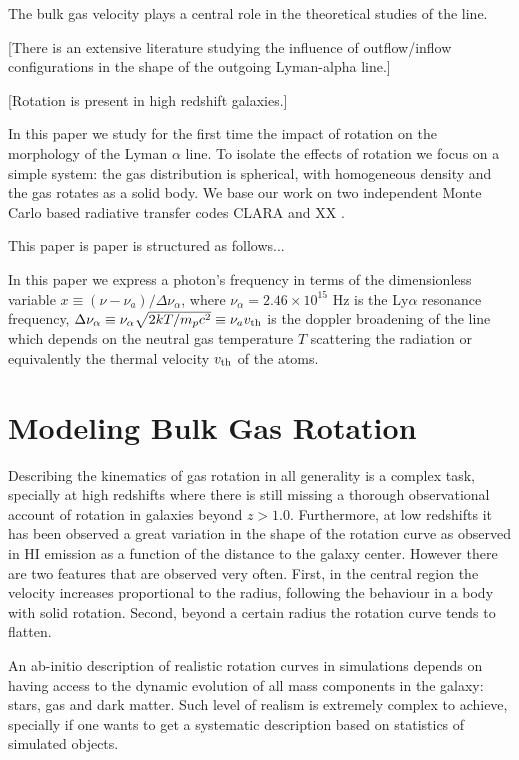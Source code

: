 \documentclass[usenatbib]{mn2e}
\newcommand{\ly}{{\ifmmode{{\rm Ly}\alpha~}\else{Ly$\alpha$~}\fi}}
\begin{document}
The bulk gas velocity
plays a central role in the theoretical studies of the \ly line. 


[There is an extensive literature studying the influence of
outflow/inflow configurations in the shape of the outgoing Lyman-alpha
line.]


[Rotation is present in high redshift galaxies.]

In this paper we study for the first time the impact of rotation on
the morphology of the Lyman $\alpha$ line. To isolate the effects of
rotation we focus on a simple system: the gas distribution is
spherical, with homogeneous density and the gas rotates as a solid
body. We base our work on two independent Monte Carlo based radiative
transfer codes CLARA \citep{CLARA} and XX \citep{DijkstraKramer}.

 
This paper is paper is structured as follows...

In this paper we express a photon's frequency in terms of the
dimensionless variable $x\equiv (\nu -\nu_a)/\Delta\nu_\alpha$, where
$\nu_{\alpha}=2.46\times 10^{15}$ Hz is the Ly$\alpha$ resonance
frequency,  $\Delta\nu_{\alpha} \equiv
\nu_{\alpha}\sqrt{2kT/m_pc^2}\equiv \nu_av_{\rm th} $ is the doppler
broadening of the line which depends on the neutral gas temperature
$T$ scattering the radiation or equivalently the thermal velocity
$v_{\rm th}$ of the atoms. 


\section{Modeling Bulk Gas Rotation}
\label{sec:implementation}

Describing the kinematics of gas rotation in all generality is a
complex task, specially at high redshifts where there is still missing
a thorough observational account of rotation in galaxies beyond
$z>1.0$. Furthermore, at low redshifts it has been observed a great
variation in the shape of the rotation curve as observed in HI
emission as a function of the distance to the galaxy center. However
there are two features that are observed very often. First, in the
central region the velocity increases proportional to the radius,
following the behaviour in a body with solid rotation. Second, beyond
a certain radius the rotation curve tends to flatten. 

An ab-initio description of realistic rotation curves in simulations
depends on having access to the dynamic evolution of all mass components
in the galaxy: stars, gas and dark matter. Such level of realism is
extremely complex to achieve, specially if one wants to get a
systematic description based on statistics of simulated objects.
\end{document}
